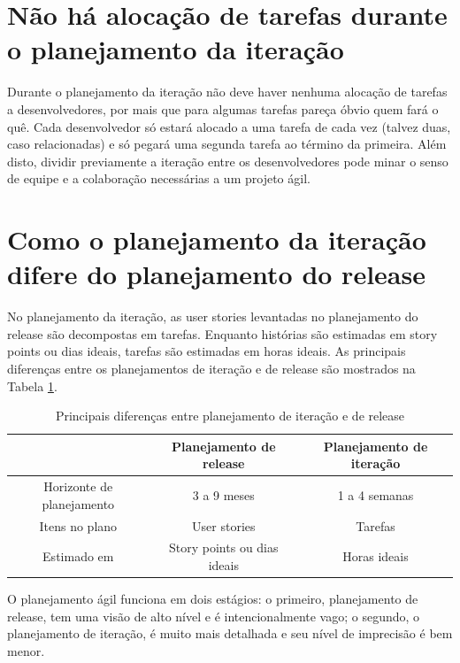 \documentclass[a4paper,abntfigtabnum,noindentfirst]{abnt}
\begin{document}
\section{Não há alocação de tarefas durante o planejamento da iteração}

Durante o planejamento da iteração não deve haver nenhuma alocação de tarefas a desenvolvedores, por mais que para algumas tarefas pareça óbvio quem fará o quê. Cada desenvolvedor só estará alocado a uma tarefa de cada vez (talvez duas, caso relacionadas) e só pegará uma segunda tarefa ao término da primeira. Além disto, dividir previamente a iteração entre os desenvolvedores pode minar o senso de equipe e a colaboração necessárias a um projeto ágil.

\section{Como o planejamento da iteração difere do planejamento do release}

No planejamento da iteração, as user stories levantadas no planejamento do release são decompostas em tarefas. Enquanto histórias são estimadas em story points ou dias ideais, tarefas são estimadas em horas ideais. As principais diferenças entre os planejamentos de iteração e de release são mostrados na Tabela \ref{diferencas-entre-planejamento-iteracao-e-release}.

\begin{table}
  \caption{Principais diferenças entre planejamento de iteração e de release}
  \label{diferencas-entre-planejamento-iteracao-e-release}
  \begin{center}
    \begin{tabular}{c c c}
      \hline
       &\textbf{Planejamento de release}&\textbf{Planejamento de iteração}\\
      \hline
      Horizonte de planejamento&3 a 9 meses&1 a 4 semanas\\
      Itens no plano&User stories&Tarefas\\
      Estimado em&Story points ou dias ideais&Horas ideais\\
      \hline
    \end{tabular}
  \end{center}
\end{table}

O planejamento ágil funciona em dois estágios: o primeiro, planejamento de release, tem uma visão de alto nível e é intencionalmente vago; o segundo, o planejamento de iteração, é muito mais detalhada e seu nível de imprecisão é bem menor. 
\end{document}
